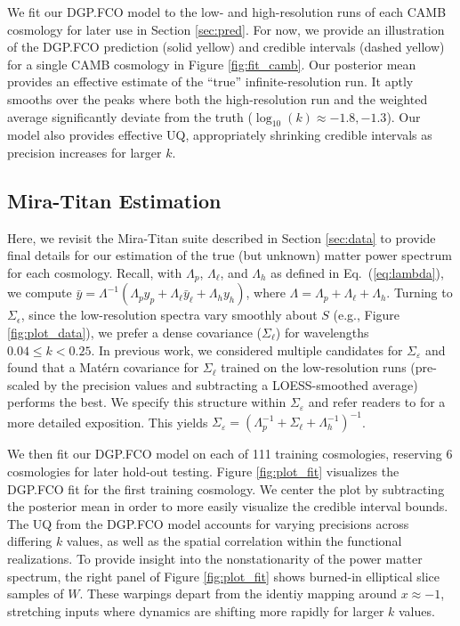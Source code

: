 \documentclass[11pt]{article}
\begin{document}
We fit our DGP.FCO model to the low- and high-resolution runs of each CAMB cosmology for
later use in Section \ref{sec:pred}.  For now, we provide an illustration of the DGP.FCO
prediction (solid yellow) and credible intervals (dashed yellow) for a single 
CAMB cosmology in Figure \ref{fig:fit_camb}.  Our posterior mean provides an effective estimate
of the ``true'' infinite-resolution run.  It aptly smooths over the peaks where 
both the high-resolution run and the weighted average significantly deviate from the truth
($\log_{10}(k)\approx -1.8,-1.3$). Our model also provides effective UQ, appropriately shrinking
credible intervals as precision increases for larger $k$.

\subsection{Mira-Titan Estimation}
\label{subsec:mira_fit}

Here, we revisit the Mira-Titan suite described in Section \ref{sec:data} to provide
final details for our estimation of the true (but unknown) matter power spectrum for
each cosmology.  Recall, with $\Lambda_p$, $\Lambda_\ell$, and $\Lambda_h$ as 
defined in Eq.~(\ref{eq:lambda}), we compute
$\bar y = \Lambda^{-1}(\Lambda_p y_p + \Lambda_{\ell} \bar{y}_\ell + \Lambda_h y_h)$, 
where $\Lambda = \Lambda_p + \Lambda_\ell + \Lambda_h$.
Turning to $\Sigma_\epsilon$, since the low-resolution spectra 
vary smoothly about $S$ (e.g., Figure \ref{fig:plot_data}), we prefer a dense 
covariance ($\Sigma_\ell$) for wavelengths $0.04 \leq k < 0.25$.
In previous work, we considered multiple candidates for 
$\Sigma_\varepsilon$ \citep{walsh2023bayesian} and found that a Mat\'ern covariance 
for $\Sigma_\ell$ trained on the low-resolution runs (pre-scaled by the precision 
values and subtracting a LOESS-smoothed average) performs the best. 
We specify this structure within $\Sigma_\varepsilon$ and refer readers 
to \cite{walsh2023bayesian} for a more detailed exposition. This yields 
$\Sigma_\varepsilon=\left(\Lambda_p^{-1} + \Sigma_\ell + \Lambda_h^{-1}\right)^{-1}$.

We then fit our DGP.FCO model on each of 111 training cosmologies, reserving 6 cosmologies
for later hold-out testing.  Figure \ref{fig:plot_fit} 
visualizes the DGP.FCO fit for the first training cosmology.  We center the plot
by subtracting the posterior mean in order to more easily visualize the credible
interval bounds.  The UQ from the DGP.FCO model accounts for varying precisions 
across differing $k$ values, as well as the spatial correlation within the 
functional realizations.  To provide insight into the nonstationarity of the power
matter spectrum, the right panel of Figure \ref{fig:plot_fit} shows burned-in elliptical 
slice samples of $W$.
These warpings depart from the identiy mapping around $x\approx-1$, 
stretching inputs where dynamics are shifting more rapidly for larger $k$ values.
\end{document}
